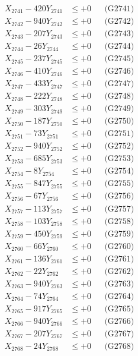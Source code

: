 \documentclass[a4paper,10pt]{article}
\begin{document}
{\begin{align}
\allowbreak
X_{2741} - 420Y_{2741} &\leq +0 && \text{(G2741)} \\
X_{2742} - 940Y_{2742} &\leq +0 && \text{(G2742)} \\
X_{2743} - 207Y_{2743} &\leq +0 && \text{(G2743)} \\
X_{2744} - 26Y_{2744} &\leq +0 && \text{(G2744)} \\
X_{2745} - 237Y_{2745} &\leq +0 && \text{(G2745)} \\
X_{2746} - 410Y_{2746} &\leq +0 && \text{(G2746)} \\
X_{2747} - 433Y_{2747} &\leq +0 && \text{(G2747)} \\
X_{2748} - 222Y_{2748} &\leq +0 && \text{(G2748)} \\
X_{2749} - 303Y_{2749} &\leq +0 && \text{(G2749)} \\
X_{2750} - 187Y_{2750} &\leq +0 && \text{(G2750)} \\
\allowbreak
X_{2751} - 73Y_{2751} &\leq +0 && \text{(G2751)} \\
X_{2752} - 940Y_{2752} &\leq +0 && \text{(G2752)} \\
X_{2753} - 685Y_{2753} &\leq +0 && \text{(G2753)} \\
X_{2754} - 8Y_{2754} &\leq +0 && \text{(G2754)} \\
X_{2755} - 847Y_{2755} &\leq +0 && \text{(G2755)} \\
X_{2756} - 67Y_{2756} &\leq +0 && \text{(G2756)} \\
X_{2757} - 113Y_{2757} &\leq +0 && \text{(G2757)} \\
X_{2758} - 103Y_{2758} &\leq +0 && \text{(G2758)} \\
X_{2759} - 450Y_{2759} &\leq +0 && \text{(G2759)} \\
X_{2760} - 66Y_{2760} &\leq +0 && \text{(G2760)} \\
\allowbreak
X_{2761} - 136Y_{2761} &\leq +0 && \text{(G2761)} \\
X_{2762} - 22Y_{2762} &\leq +0 && \text{(G2762)} \\
X_{2763} - 940Y_{2763} &\leq +0 && \text{(G2763)} \\
X_{2764} - 74Y_{2764} &\leq +0 && \text{(G2764)} \\
X_{2765} - 917Y_{2765} &\leq +0 && \text{(G2765)} \\
X_{2766} - 940Y_{2766} &\leq +0 && \text{(G2766)} \\
X_{2767} - 207Y_{2767} &\leq +0 && \text{(G2767)} \\
X_{2768} - 24Y_{2768} &\leq +0 && \text{(G2768)} \\

\end{align}}
\end{document}
